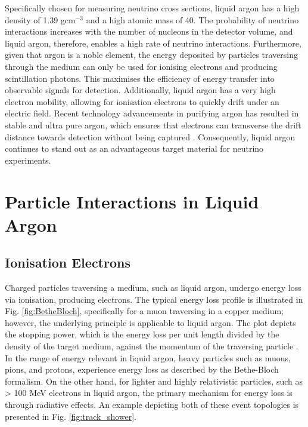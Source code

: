 Specifically chosen for measuring neutrino cross sections, liquid argon has a high density of 1.39 gcm$^{-3}$ and a high atomic mass of 40.
The probability of neutrino interactions increases with the number of nucleons in the detector volume, and liquid argon, therefore, enables a high rate of neutrino interactions.
Furthermore, given that argon is a noble element, the energy deposited by particles traversing through the medium can only be used for ionising electrons and producing scintillation photons.
This maximises the efficiency of energy transfer into observable signals for detection.
Additionally, liquid argon has a very high electron mobility, allowing for ionisation electrons to quickly drift under an electric field.
Recent technology advancements in purifying argon has resulted in stable and ultra pure argon, which ensures that electrons can transverse the drift distance towards detection without being captured \cite{ubooneEtime}.
Consequently, liquid argon continues to stand out as an advantageous target material for neutrino experiments. 


\section{Particle Interactions in Liquid Argon}
\label{sec3:creation}

\subsection{Ionisation Electrons}

Charged particles traversing a medium, such as liquid argon, undergo energy loss via ionisation, producing electrons. 
The typical energy loss profile is illustrated in Fig. \ref{fig:BetheBloch}, specifically for a muon traversing in a copper medium; however, the underlying principle is applicable to liquid argon.
The plot depicts the stopping power, which is the energy loss per unit length divided by the density of the target medium, against the momentum of the traversing particle \cite{Passage}.
In the range of energy relevant in liquid argon, heavy particles such as muons, pions, and protons, experience energy loss as described by the Bethe-Bloch formalism.
On the other hand, for lighter and highly relativistic particles, such as > 100 MeV electrons in liquid argon, the primary mechanism for energy loss is through radiative effects.
An example depicting both of these event topologies is presented in Fig. \ref{fig:track_shower}.

